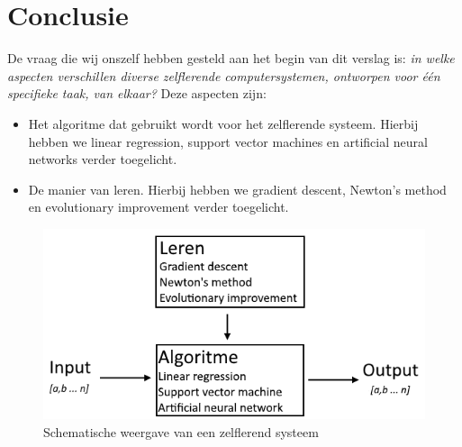 \documentclass[a4paper,titlepage]{article}
\begin{document}
\newpage


\newpage


\newpage


\newpage


\newpage


\newpage


\newpage


\newpage
\section{Conclusie}
De vraag die wij onszelf hebben gesteld aan het begin van dit verslag is: \textit{in welke aspecten verschillen diverse zelflerende computersystemen, ontworpen voor \'e\'en specifieke taak, van elkaar?} Deze aspecten zijn:
\begin{itemize}  
\item Het algoritme dat gebruikt wordt voor het zelflerende systeem. Hierbij hebben we linear regression, support vector machines en artificial neural networks verder toegelicht.
\item De manier van leren. Hierbij hebben we gradient descent, Newton's method en evolutionary improvement verder toegelicht.
\end{itemize}

\begin{figure}[H]
  \centering
    \includegraphics[width=\textwidth]{algorithm3.png}
  \caption{Schematische weergave van een zelflerend systeem}
  \label{fig:datasetBFS3}
\end{figure}
\end{document}
